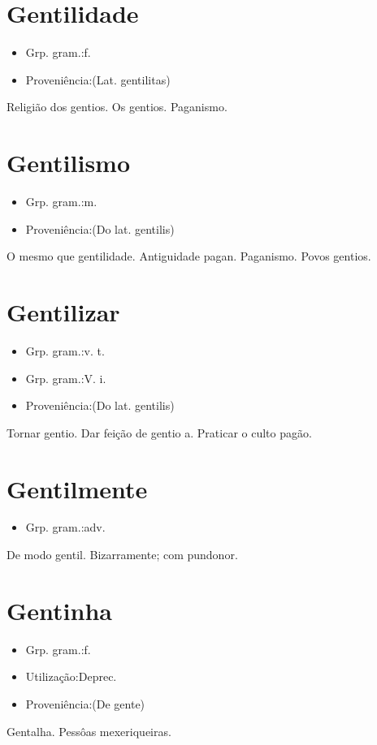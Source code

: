 \section{Gentilidade}
\begin{itemize}
\item {Grp. gram.:f.}
\end{itemize}
\begin{itemize}
\item {Proveniência:(Lat. \textunderscore gentilitas\textunderscore )}
\end{itemize}
Religião dos gentios.
Os gentios.
Paganismo.
\section{Gentilismo}
\begin{itemize}
\item {Grp. gram.:m.}
\end{itemize}
\begin{itemize}
\item {Proveniência:(Do lat. \textunderscore gentilis\textunderscore )}
\end{itemize}
O mesmo que \textunderscore gentilidade\textunderscore .
Antiguidade pagan.
Paganismo.
Povos gentios.
\section{Gentilizar}
\begin{itemize}
\item {Grp. gram.:v. t.}
\end{itemize}
\begin{itemize}
\item {Grp. gram.:V. i.}
\end{itemize}
\begin{itemize}
\item {Proveniência:(Do lat. \textunderscore gentilis\textunderscore )}
\end{itemize}
Tornar gentio.
Dar feição de gentio a.
Praticar o culto pagão.
\section{Gentilmente}
\begin{itemize}
\item {Grp. gram.:adv.}
\end{itemize}
De modo gentil.
Bizarramente; com pundonor.
\section{Gentinha}
\begin{itemize}
\item {Grp. gram.:f.}
\end{itemize}
\begin{itemize}
\item {Utilização:Deprec.}
\end{itemize}
\begin{itemize}
\item {Proveniência:(De \textunderscore gente\textunderscore )}
\end{itemize}
Gentalha.
Pessôas mexeriqueiras.
